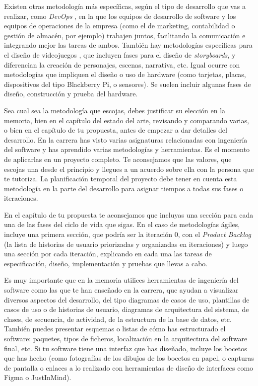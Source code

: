 Existen otras metodología más específicas, según el tipo de desarrollo que vas a realizar, como \textit{DevOps} \cite{freeman2019devops}, en la que los  equipos de desarrollo  de software y los equipos de operaciones de la empresa (como el de marketing, contabilidad o gestión de almacén, por ejemplo) trabajen juntos, facilitando la comunicación e integrando mejor las tareas de ambos. También hay metodologías específicas para el diseño de videojuegos \cite{garcia2019desarrollo}, que incluyen fases para el diseño de \textit{storyboards}, y diferencian la creación de personajes, escenas, narrativa, etc. Igual ocurre con metodologías que impliquen el diseño o uso de hardware (como tarjetas, placas, dispositivos del tipo Blackberry Pi, o sensores). Se suelen incluir algunas fases de diseño, construcción y prueba del hardware. 

Sea cual sea la metodología que escojas, debes justificar su elección en la memoria, bien en el capítulo del estado del arte, revisando y comparando varias, o bien en el capítulo de tu propuesta, antes de empezar a dar detalles del desarrollo. En la carrera has visto varias asignaturas relacionadas con ingeniería del software y has aprendido varias metodologías y herramientas. Es el momento de aplicarlas en un proyecto completo. Te aconsejamos que las valores, que escojas una desde el principio y llegues a un acuerdo sobre ella con la persona que te tutoriza. La planificación temporal del proyecto debe tener en cuenta esta metodología en la parte del desarrollo para asignar tiempos a todas sus fases o iteraciones. 

En el capítulo de tu propuesta te aconsejamos que incluyas una sección para cada una de las fases del ciclo de vida que sigas. En el caso de metodologías ágiles, incluye una primera sección, que podría ser la iteración 0, con el \textit{Product Backlog} (la lista de historias de usuario priorizadas y organizadas en iteraciones) y luego una sección por cada iteración, explicando en cada una las tareas de especificación, diseño, implementación y pruebas que llevas a cabo.

Es muy importante que en la memoria utilices herramientas de ingeniería del software como las que te han enseñado en la carrera, que ayudan a visualizar diversos aspectos del desarrollo, del tipo diagramas de casos de uso, plantillas de casos de uso o de historias de usuario, diagramas de arquitectura del sistema, de clases, de secuencia, de actividad, de la estructura de la base de datos, etc. También puedes presentar esquemas o listas de cómo has estructurado el software: paquetes, tipos de ficheros, localización en la arquitectura del software final, etc. Si tu software tiene una interfaz que has diseñado, incluye los bocetos que has hecho (como fotografías de los dibujos de los bocetos en papel, o capturas de pantalla o enlaces a lo realizado con herramientas de diseño de interfaces como Figma o JustInMind). 

